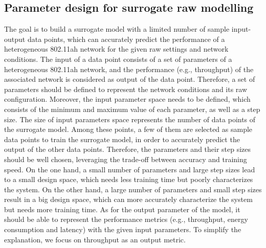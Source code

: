  
 
\subsection{Parameter design for surrogate \gls{raw} modelling \label{subsec:para_design}}


The goal is to build a surrogate model with a limited number of sample input-output data points, which can accurately predict the performance of a heterogeneous 802.11ah network for the given \gls{raw} settings and network conditions. The input of a data point consists of a set of parameters of a heterogeneous 802.11ah network, and the performance (e.g., throughput) of the associated network is considered as output of the data point. Therefore, a set of parameters should be defined to represent the network conditions and its \gls{raw} configuration. Moreover, the input parameter space needs to be defined, which consists of the minimum and maximum value of each parameter, as well as a step size. The size of input parameters space represents the number of data points of the surrogate model. Among these points, a few of them are selected as sample data points to train the surrogate model, in order to accurately predict the output of the other data points. Therefore, the parameters and their step sizes should be well chosen, leveraging the trade-off between accuracy and training speed. On the one hand, a small number of parameters and large step sizes lead to a small design space, which needs less training time but poorly characterizes the system. On the other hand, a large number of parameters and small step sizes result in a big design space, which can more accurately characterize the system but needs more training time. As for the output parameter of the model, it should be able to represent the performance metrics (e.g., throughput, energy consumption and latency) with the given input parameters. To simplify the explanation, we focus on throughput as an output metric.



